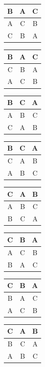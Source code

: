 \documentclass[11pt,letterpaper]{article}
\begin{document}
\noindent \begin{tabular}{|ccc|}
\hline
B&A&C\\
\hline
A&C&B\\
\hline
C&B&A\\
\hline
\end{tabular}
\quad
\begin{tabular}{|ccc|}
\hline
B&A&C\\
\hline
C&B&A\\
\hline
A&C&B\\
\hline
\end{tabular}
\quad
\begin{tabular}{|ccc|}
\hline
B&C&A\\
\hline
A&B&C\\
\hline
C&A&B\\
\hline
\end{tabular}
\quad
\begin{tabular}{|ccc|}
\hline
B&C&A\\
\hline
C&A&B\\
\hline
A&B&C\\
\hline
\end{tabular}
\newline
\newline

\noindent \begin{tabular}{|ccc|}
\hline
C&A&B\\
\hline
A&B&C\\
\hline
B&C&A\\
\hline
\end{tabular}
\quad
\begin{tabular}{|ccc|}
\hline
C&B&A\\
\hline
A&C&B\\
\hline
B&A&C\\
\hline
\end{tabular}
\quad
\begin{tabular}{|ccc|}
\hline
C&B&A\\
\hline
B&A&C\\
\hline
A&C&B\\
\hline
\end{tabular}
\quad
\begin{tabular}{|ccc|}
\hline
C&A&B\\
\hline
B&C&A\\
\hline
A&B&C\\
\hline
\end{tabular}
\end{document}
